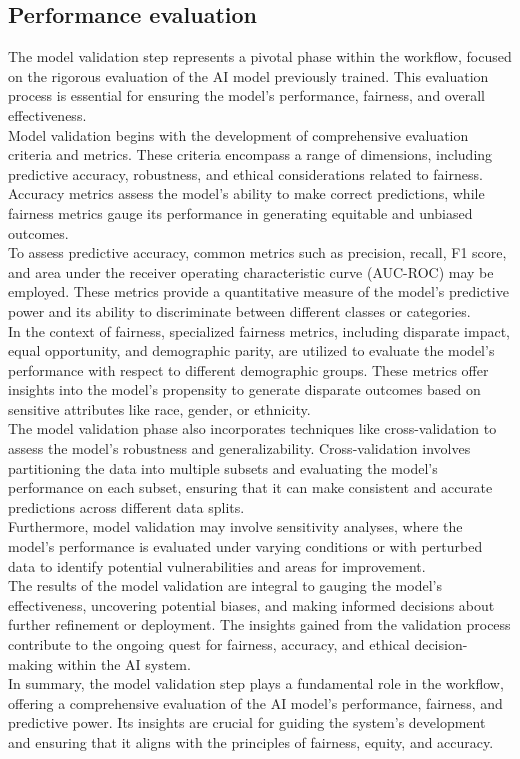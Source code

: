 \documentclass[12pt,a4paper,openright,twoside]{book}
\begin{document}
\subsection{Performance evaluation}
The model validation step represents a pivotal phase within the workflow, focused on the rigorous evaluation of the AI model previously trained. This evaluation process is essential for ensuring the model's performance, fairness, and overall effectiveness. \\
Model validation begins with the development of comprehensive evaluation criteria and metrics. These criteria encompass a range of dimensions, including predictive accuracy, robustness, and ethical considerations related to fairness. Accuracy metrics assess the model's ability to make correct predictions, while fairness metrics gauge its performance in generating equitable and unbiased outcomes. \\
To assess predictive accuracy, common metrics such as precision, recall, F1 score, and area under the receiver operating characteristic curve (AUC-ROC) may be employed. These metrics provide a quantitative measure of the model's predictive power and its ability to discriminate between different classes or categories. \\
In the context of fairness, specialized fairness metrics, including disparate impact, equal opportunity, and demographic parity, are utilized to evaluate the model's performance with respect to different demographic groups. These metrics offer insights into the model's propensity to generate disparate outcomes based on sensitive attributes like race, gender, or ethnicity. \\
The model validation phase also incorporates techniques like cross-validation to assess the model's robustness and generalizability. Cross-validation involves partitioning the data into multiple subsets and evaluating the model's performance on each subset, ensuring that it can make consistent and accurate predictions across different data splits. \\
Furthermore, model validation may involve sensitivity analyses, where the model's performance is evaluated under varying conditions or with perturbed data to identify potential vulnerabilities and areas for improvement. \\
The results of the model validation are integral to gauging the model's effectiveness, uncovering potential biases, and making informed decisions about further refinement or deployment. The insights gained from the validation process contribute to the ongoing quest for fairness, accuracy, and ethical decision-making within the AI system. \\
In summary, the model validation step plays a fundamental role in the workflow, offering a comprehensive evaluation of the AI model's performance, fairness, and predictive power. Its insights are crucial for guiding the system's development and ensuring that it aligns with the principles of fairness, equity, and accuracy. \\
\end{document}
